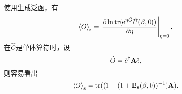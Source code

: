 \documentclass[hyperref, UTF8, a4paper]{ctexart}
\newcommand*{\ee}{\mathrm{e}}
\begin{document}
使用生成泛函，有
\begin{equation}
    \expval{O}_{\vb{s}} = \eval{\pdv{\ln \trace(\ee^{\eta \hat{O}} \hat{U}(\beta, 0))}{\eta}}_{\eta=0},
\end{equation}
在$\hat{O}$是单体算符时，设
\begin{equation}
    \hat{O} = \hat{c}^\dagger \vb{A} \hat{c},
\end{equation}
则容易看出
\begin{equation}
    \expval{O}_{\vb{s}} = \trace((1 - (1+\vb{B}_{\vb{s}}(\beta, 0))^{-1}) \vb{A}).
\end{equation}

\end{document}
